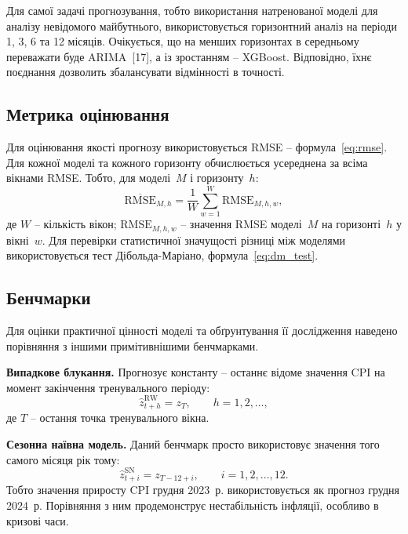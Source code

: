 \documentclass{bachelor_thesis}
\begin{document}
Для самої задачі прогнозування, тобто використання натренованої моделі для аналізу невідомого майбутнього, використовується горизонтний аналіз на періоди 1, 3, 6 та 12 місяців. Очікується, що на менших горизонтах в середньому переважати буде ARIMA~[17], а із зростанням -- XGBoost. Відповідно, їхнє поєднання дозволить збалансувати відмінності в точності.

\subsection{Метрика оцінювання}

Для оцінювання якості прогнозу використовується RMSE -- формула~\eqref{eq:rmse}. Для кожної моделі та кожного горизонту обчислюється усереднена за всіма вікнами RMSE. Тобто, для моделі~$M$ і горизонту~$h$:
\begin{equation*}
\overline{\text{RMSE}}_{M,h} = \frac{1}{W}\sum_{w=1}^{W} \text{RMSE}_{M,h,w},
\end{equation*}
\noindent де $W$ -- кількість вікон; $\text{RMSE}_{M,h,w}$ -- значення RMSE моделі~$M$ на горизонті~$h$ у вікні~$w$. Для перевірки статистичної значущості різниці між моделями використовується тест Дібольда-Маріано, формула~\eqref{eq:dm_test}.

\subsection{Бенчмарки}

Для оцінки практичної цінності моделі та обґрунтування її дослідження наведено порівняння з іншими примітивнішими бенчмарками.

\textbf{Випадкове блукання.} Прогнозує константу -- останнє відоме значення CPI на момент закінчення тренувального періоду:
\begin{equation*}
\hat{z}_{t+h}^{\text{RW}} = z_T, \qquad h = 1, 2, \ldots,
\end{equation*}
\noindent де $T$ -- остання точка тренувального вікна.

\textbf{Сезонна наївна модель.} Даний бенчмарк просто використовує значення того самого місяця рік тому:
\begin{equation*}
\hat{z}_{t+i}^{\text{SN}} = z_{T-12+i}, \qquad i = 1, 2, \ldots, 12.
\end{equation*}
\noindent Тобто значення приросту CPI грудня 2023~р. використовується як прогноз грудня 2024~р. Порівняння з ним продемонструє нестабільність інфляції, особливо в кризові часи.
\end{document}
